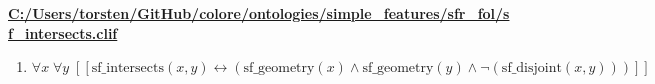 \documentclass{article}
\begin{document}
\textbf{\url{C:/Users/torsten/GitHub/colore/ontologies/simple\_features/sfr\_fol/sf\_intersects.clif}}

\begin{enumerate}
\item $\forall x\; \forall y\;  \left[ \left[ \textrm{sf\_intersects}(x,y) \leftrightarrow \left(\textrm{sf\_geometry}(x) \land \textrm{sf\_geometry}(y) \land \neg \left(\textrm{sf\_disjoint}(x,y)\right)\right) \right] \right]$
\end{enumerate}
\end{document}
